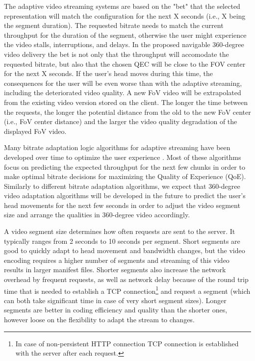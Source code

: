 The adaptive video streaming systems are based on the "bet" that the selected representation will match the configuration for the next X seconds (i.e., X being the segment duration). The requested bitrate needs to match the current throughput for the duration of the segment, otherwise the user might experience the video stalls, interruptions, and delays. In the proposed navigable 360-degree video delivery the bet is not only that the throughput will accomodate the requested bitrate, but also that the chosen QEC will be close to the FOV center for the next X seconds. If the user's head moves during this time, the consequences for the user will be even worse than with the adaptive streaming, including the deteriorated video quality. A new FoV video will be extrapolated from the existing video version stored on the client. The longer the time between the requests, the longer the potential distance from the old to the new FoV center (i.e., FoV center distance) and the larger the video quality degradation of the displayed FoV video.

Many bitrate adaptation logic algorithms for adaptive streaming have been developed over time to optimize the user experience \cite{}. Most of these algorithms focus on predicting the expected throughput for the next few chunks in order to make optimal bitrate decisions for maximizing the Quality of Experience (QoE). Similarly to different bitrate adaptation algorithms, we expect that 360-degree video adaptation algorithms will be developed in the future to predict the user's head movements for the next few seconds in order to adjust the video segment size and arrange the qualities in 360-degree video accordingly. %

A video segment size determines how often requests are sent to the server. It typically ranges from 2 seconds to 10 seconds per segment. Short segments are good to quickly adapt to head movement and bandwidth changes, but the video encoding requires a higher number of segments and streaming of this video results in larger manifest files. Shorter segments also increase the network overhead by frequent requests, as well as network delay because of the round trip time that is needed to establish a TCP connection\footnote{In case of non-persistent HTTP connection TCP connection is established with the server after each request.} and request a segment (which can both take significant time in case of very short segment sizes). Longer segments are better in coding efficiency and quality than the shorter ones, however loose on the flexibility to adapt the stream to changes.


